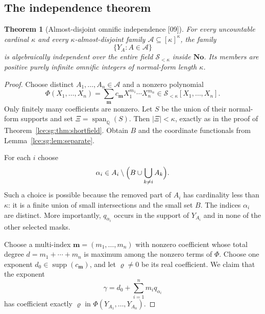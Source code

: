 \documentclass[11pt,letterpaper]{article}
\numberwithin{equation}{section}
\newtheorem{theorem}{Theorem}[section]
\theoremstyle{definition}
\theoremstyle{remark}
\newcommand{\No}{\mathbf{No}}
\newcommand{\Q}{\mathbb Q}
\newcommand{\supp}{\operatorname{supp}}
\newcommand{\Sk}{\mathscr S_{<\kappa}}
\newcommand{\abs}[1]{\lvert#1\rvert}
\newcommand{\thref}[1]{Theorem~\ref{#1}}
\newcommand{\leref}[1]{Lemma~\ref{#1}}
\newcommand{\src}[1]{\textup{\textsf{\small[#1]}}}%
\newcommand{\Span}{\operatorname{span}_{\Q}}
\begin{document}
\subsection{The independence theorem}
\begin{theorem}[Almost-disjoint omnific independence \src{09}]\label{lce:sg:thm:AD}
For every uncountable cardinal $\kappa$ and every $\kappa$-almost-disjoint
family $\mathcal A\subseteq[\kappa]^\kappa$, the family
\begin{equation}\label{lce:sg:eq:AD-family}
 \{Y_A:A\in\mathcal A\}
\end{equation}
is algebraically independent over the entire field $\Sk$ inside $\No$. Its
members are positive purely infinite omnific integers of normal-form length
$\kappa$.
\end{theorem}
\begin{proof}
Choose distinct $A_1,\ldots,A_n\in\mathcal A$ and a nonzero polynomial
\begin{equation}\label{lce:sg:eq:P}
 \Phi(X_1,\ldots,X_n)=\sum_{\mathbf m}c_{\mathbf m}X_1^{m_1}\cdots X_n^{m_n}
 \in\Sk[X_1,\ldots,X_n].
\end{equation}
Only finitely many coefficients are nonzero. Let $S$ be the union of their
normal-form supports and set $\Xi=\Span(S)$. Then $\abs\Xi<\kappa$, exactly
as in the proof of \thref{lce:sg:thm:shortfield}. Obtain $B$ and the
coordinate functionals from \leref{lce:sg:lem:separate}.

For each $i$ choose
\begin{equation}\label{lce:sg:eq:private-index}
 \alpha_i\in A_i\setminus\Bigl(B\cup\bigcup_{k\ne i}A_k\Bigr).
\end{equation}
Such a choice is possible because the removed part of $A_i$ has cardinality
less than $\kappa$: it is a finite union of small intersections and the
small set $B$. The indices $\alpha_i$ are distinct. More importantly,
$q_{\alpha_i}$ occurs in the support of $Y_{A_i}$ and in none of the other
selected masks.

Choose a multi-index $\mathbf m=(m_1,\ldots,m_n)$ with nonzero coefficient
whose total degree $d=m_1+\cdots+m_n$ is maximum among the nonzero terms of
$\Phi$. Choose one exponent $d_0\in\supp(c_{\mathbf m})$, and let
$\varrho\ne0$ be its real coefficient. We claim that the exponent
\begin{equation}\label{lce:sg:eq:distinguished-exp}
 \gamma=d_0+\sum_{i=1}^n m_i q_{\alpha_i}
\end{equation}
has coefficient exactly $\varrho$ in $\Phi(Y_{A_1},\ldots,Y_{A_n})$.


\end{proof}
\end{document}
